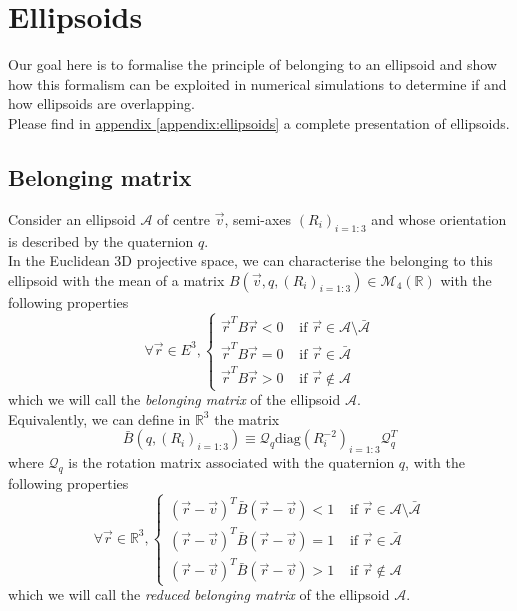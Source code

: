 \documentclass[class=report, float=false, crop=false]{standalone}
\begin{document}
\chapter{Ellipsoids}
\label{chap:ellipsoids}

Our goal here is to formalise the principle of belonging to an ellipsoid and show how this formalism can be exploited in numerical simulations to determine if and how ellipsoids are overlapping.\\

Please find in \hyperref[appendix:ellipsoids]{appendix \ref{appendix:ellipsoids}} a complete presentation of ellipsoids.

\section{Belonging matrix}

Consider an ellipsoid $\mathcal{A}$ of centre $\vec{v}$, semi-axes $(R_i)_{i=1:3}$ and whose orientation is described by the quaternion $q$.\\

In the Euclidean 3D projective space, we can characterise the belonging to this ellipsoid with the mean of a matrix $B(\vec{v},q,(R_i)_{i=1:3}) \in \mathcal{M}_{4}(\mathbb{R})$ with the following properties
\begin{equation}
\forall \vec{r} \in E^3, \begin{cases} \vec{r}^T B \vec{r} < 0 &\text{ if } \vec{r} \in \mathcal{A} \setminus \bar{\mathcal{A}} \\ \vec{r}^T B \vec{r} = 0 &\text{ if } \vec{r} \in \bar{\mathcal{A}} \\ \vec{r}^T B \vec{r} > 0 &\text{ if } \vec{r} \notin \mathcal{A} \end{cases}
\label{belonging_definition_}
\end{equation}
which we will call the \textit{belonging matrix} of the ellipsoid $\mathcal{A}$.\\

Equivalently, we can define in $\mathbb{R}^3$ the matrix
\begin{equation}
\boxed{
\bar{B}(q,(R_i)_{i=1:3}) \equiv \mathcal{Q}_q\text{diag}(R_i^{-2})_{i=1:3}\mathcal{Q}_q^T
}
\label{reduced_belonging_matrix_}
\end{equation}
where $\mathcal{Q}_q$ is the rotation matrix associated with the quaternion $q$, with the following properties
\begin{equation}
\forall \vec{r} \in \mathbb{R}^3, \begin{cases} (\vec{r} - \vec{v})^T \bar{B} (\vec{r} - \vec{v}) < 1 &\text{ if } \vec{r} \in \mathcal{A} \setminus \bar{\mathcal{A}} \\ (\vec{r} - \vec{v})^T \bar{B} (\vec{r} - \vec{v}) = 1 &\text{ if } \vec{r} \in \bar{\mathcal{A}} \\ (\vec{r} - \vec{v})^T \bar{B} (\vec{r} - \vec{v}) > 1 &\text{ if } \vec{r} \notin \mathcal{A} \end{cases}
\label{reduced_belonging_definition_}
\end{equation}
which we will call the \textit{reduced belonging matrix} of the ellipsoid $\mathcal{A}$.\\
\end{document}
